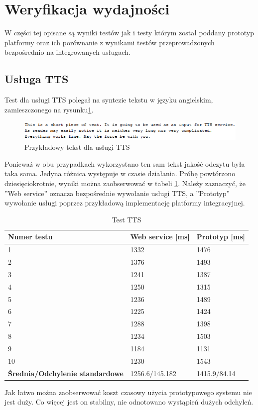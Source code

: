 \section{Weryfikacja wydajności}
W części tej opisane są wyniki testów jak i testy którym został poddany prototyp platformy oraz ich porównanie z wynikami testów przeprowadzonych bezpośrednio na integrowanych usługach.
\subsection{Usługa TTS}
Test dla usługi TTS polegał na syntezie tekstu  w języku angielskim, zamieszczonego na rysunku\ref{fig:ttsExample}.
\begin{figure}[!h]
\centering
\includegraphics[scale=0.9]{textExample.png}
\caption{Przykładowy tekst dla usługi TTS}\label{fig:ttsExample}
\end{figure}
Ponieważ w obu przypadkach wykorzystano ten sam tekst jakość odczytu była taka sama. Jedyna różnica występuje w czasie działania. Próbę powtórzono dziesięciokrotnie, wyniki można zaobserwować w tabeli \ref{tab:tts}. Należy zaznaczyć, że ''Web service'' oznacza bezpośrednie wywołanie usługi TTS, a ''Prototyp'' wywołanie usługi poprzez przykładową implementację platformy integracyjnej.
\begin{center}
	\begin{table}[h]
	\caption{Test TTS}
	\label{tab:tts}
	\centering
	\begin{tabular}{| l | l | l |}	
		\hline
		\textbf{Numer testu} & \textbf{Web service [ms]} & \textbf{Prototyp [ms]} \\ \hline
		1 & 1332 & 1476\\ \hline
		2 & 1376 & 1493\\ \hline
		3 & 1241 & 1387\\ \hline
		4 & 1250 & 1315\\ \hline
		5 & 1236 & 1489\\ \hline
		6 & 1225 & 1424\\ \hline
		7 & 1288 & 1398\\ \hline
		8 & 1234 & 1503\\ \hline
		9 & 1184 & 1131\\ \hline
		10 & 1230 & 1543\\ \hline
		\textbf{Średnia/Odchylenie standardowe} & 1256.6/145.182 & 1415.9/84.14\\ 
		\hline
	\end{tabular}
	\end{table}
\end{center}
Jak łatwo można zaobserwować koszt czasowy użycia prototypowego systemu nie jest duży. Co więcej jest on stabilny, nie odnotowano wystąpień dużych odchyleń. 

